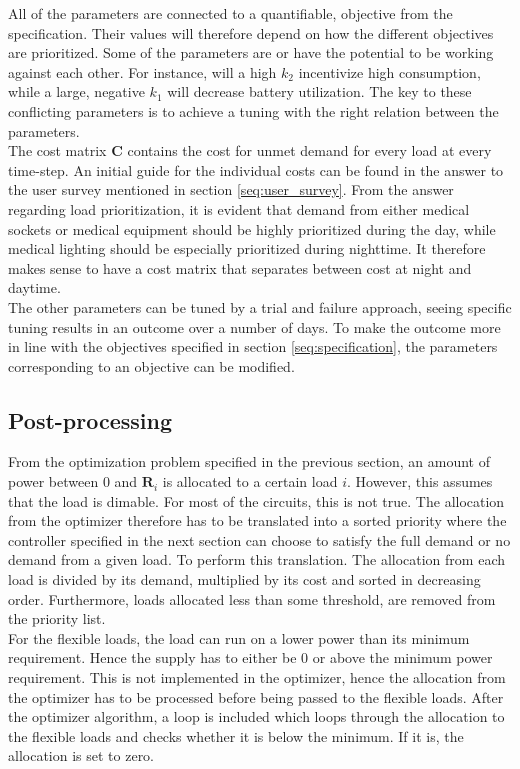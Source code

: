 All of the parameters are connected to a quantifiable, objective from the specification. Their values will therefore depend on how the different objectives are prioritized. Some of the parameters are or have the potential to be working against each other. For instance, will a high $k_2$ incentivize high consumption, while a large, negative $k_1$ will decrease battery utilization. The key to these conflicting parameters is to achieve a tuning with the right relation between the parameters.\\

The cost matrix \textbf{C} contains the cost for unmet demand for every load at every time-step. An initial guide for the individual costs can be found in the answer to the user survey mentioned in section \ref{seq:user_survey}. From the answer regarding load prioritization, it is evident that demand from either medical sockets or medical equipment should be highly prioritized during the day, while medical lighting should be especially prioritized during nighttime. It therefore makes sense to have a cost matrix that separates between cost at night and daytime.\\

The other parameters can be tuned by a trial and failure approach, seeing specific tuning results in an outcome over a number of days. To make the outcome more in line with the objectives specified in section \ref{seq:specification}, the parameters corresponding to an objective can be modified.\\

\subsection{Post-processing}\label{sec:post_processing}
From the optimization problem specified in the previous section, an amount of power between 0 and $\mathbf{R}_i$ is allocated to a certain load $i$. However, this assumes that the load is dimable. For most of the circuits, this is not true. The allocation from the optimizer therefore has to be translated into a sorted priority where the controller specified in the next section can choose to satisfy the full demand or no demand from a given load. To perform this translation. The allocation from each load is divided by its demand, multiplied by its cost and sorted in decreasing order. Furthermore, loads allocated less than some threshold, are removed from the priority list.\\ 

For the flexible loads, the load can run on a lower power than its minimum requirement. Hence the supply has to either be 0 or above the minimum power requirement. This is not implemented in the optimizer, hence the allocation from the optimizer has to be processed before being passed to the flexible loads. After the optimizer algorithm, a loop is included which loops through the allocation to the flexible loads and checks whether it is below the minimum. If it is, the allocation is set to zero.


